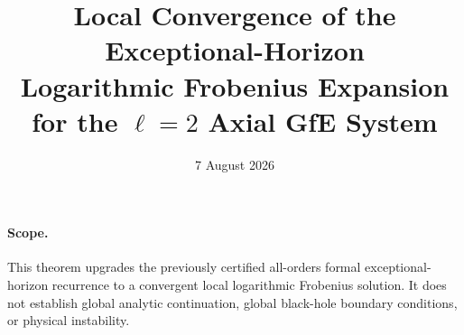 \documentclass[11pt]{article}
\begin{document}
\title{Local Convergence of the Exceptional-Horizon\\
Logarithmic Frobenius Expansion for the $\ell=2$ Axial GfE System}
\date{7 August 2026}
\maketitle

\paragraph{Scope.}
This theorem upgrades the previously certified all-orders formal
exceptional-horizon recurrence to a convergent local logarithmic
Frobenius solution.  It does not establish global analytic
continuation, global black-hole boundary conditions, or physical
instability.
\end{document}
